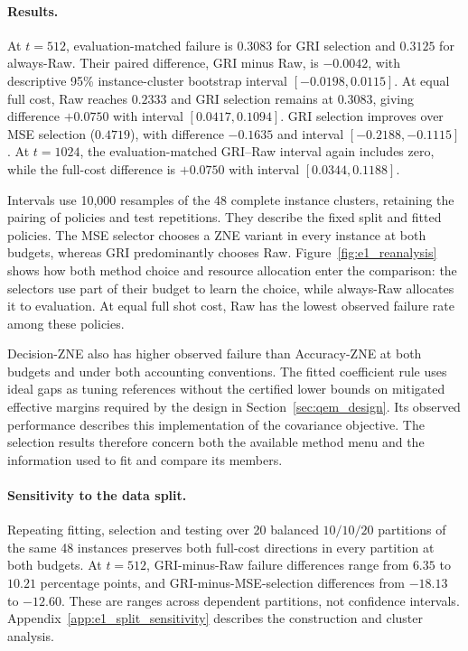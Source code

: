 \documentclass[a4paper,onecolumn,unpublished,nopdfoutputerror]{quantumarticle}
\theoremstyle{plain}
\theoremstyle{definition}
\newcommand{\1}{\mathbf{1}}
\begin{document}
\paragraph{Results.}
At $t=512$, evaluation-matched failure is $0.3083$ for GRI selection and $0.3125$ for always-Raw. Their paired difference, GRI minus Raw, is $-0.0042$, with descriptive 95\% instance-cluster bootstrap interval $[-0.0198,0.0115]$. At equal full cost, Raw reaches $0.2333$ and GRI selection remains at $0.3083$, giving difference $+0.0750$ with interval $[0.0417,0.1094]$. GRI selection improves over MSE selection ($0.4719$), with difference $-0.1635$ and interval $[-0.2188,-0.1115]$. At $t=1024$, the evaluation-matched GRI--Raw interval again includes zero, while the full-cost difference is $+0.0750$ with interval $[0.0344,0.1188]$.

Intervals use 10,000 resamples of the 48 complete instance clusters, retaining the pairing of policies and test repetitions. They describe the fixed split and fitted policies. The MSE selector chooses a ZNE variant in every instance at both budgets, whereas GRI predominantly chooses Raw. Figure~\ref{fig:e1_reanalysis} shows how both method choice and resource allocation enter the comparison: the selectors use part of their budget to learn the choice, while always-Raw allocates it to evaluation. At equal full shot cost, Raw has the lowest observed failure rate among these policies.

Decision-ZNE also has higher observed failure than Accuracy-ZNE at both budgets and under both accounting conventions. The fitted coefficient rule uses ideal gaps as tuning references without the certified lower bounds on mitigated effective margins required by the design in Section~\ref{sec:qem_design}. Its observed performance describes this implementation of the covariance objective. The selection results therefore concern both the available method menu and the information used to fit and compare its members.

\paragraph{Sensitivity to the data split.}
Repeating fitting, selection and testing over 20 balanced $10/10/20$ partitions of the same 48 instances preserves both full-cost directions in every partition at both budgets. At $t=512$, GRI-minus-Raw failure differences range from $6.35$ to $10.21$ percentage points, and GRI-minus-MSE-selection differences from $-18.13$ to $-12.60$. These are ranges across dependent partitions, not confidence intervals. Appendix~\ref{app:e1_split_sensitivity} describes the construction and cluster analysis.
\end{document}

